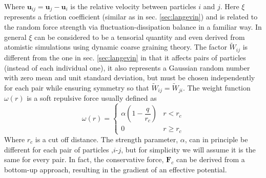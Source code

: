 \documentclass[ twoside,openright,titlepage,numbers=noenddot,%
headinclude,footinclude,cleardoublepage=empty,abstract=on,
BCOR=5mm,paper=a4,fontsize=11pt, dvipsnames
]{scrreprt}
\renewcommand{\vec}[1]{\bm{#1}}
\newcommand{\ppos}{q}
\newcommand{\pvel}{u}
\begin{document}
Where $\vec{\pvel}_{ij} = \vec{\pvel}_j - \vec{\pvel}_i$ is the relative velocity between particles $i$ and $j$. Here $\xi$ represents a friction coefficient (similar as in sec. \ref{sec:langevin}) and is related to the random force strength via fluctuation-dissipation balance in a familiar way\cite{Espanol1995}. In general $\xi$ can be considered to be a tensorial quantity and even derived from atomistic simulations using dynamic coarse graining theory\cite{Hijon2010}. The factor $\widetilde{W}_{ij}$ is different from the one in sec. \ref{sec:langevin} in that it affects pairs of particles (instead of each individual one), it also represents a Gaussian random number with zero mean and unit standard deviation, but must be chosen independently for each pair while ensuring symmetry so that $\widetilde{W}_{ij} = \widetilde{W}_{ji}$.
The weight function $\omega(r)$ is a soft repulsive force usually defined as
\begin{equation}
  \label{eq:dpdw}
  \omega(r) =
  \begin{cases}
    \alpha\left(1-\dfrac{\ppos}{r_{c}}\right) & r<r_{c}\\
    0 & r\ge r_{c}
  \end{cases}
\end{equation}
Where $r_{c}$ is a cut off distance. The strength parameter, $\alpha$, can in principle be different for each pair of particles ,$i$-$j$, but for simplicity we will assume it is the same for every pair. In fact, the conservative force, $\vec{F}_c$ can be derived from a bottom-up approach, resulting in the gradient of an effective potential\cite{Hijon2010}.
\end{document}
